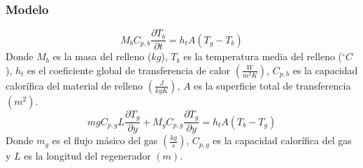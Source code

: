 \documentclass[12pt,letterpaper,final]{article}%
\begin{document}
\subsubsection*{Modelo}
\begin{equation}
	M_b C_{p,b}\frac{\partial T_b}{\partial t} = h_t A (T_g - T_b) 
\end{equation}
Donde $M_b$ es la masa del relleno ($kg$), $T_b$ es la temperatura media del relleno ($^\circ C$), $h_t$ es el coeficiente global de transferencia de calor $(\frac{W}{m^2 K})$, $C_{p,b}$ es la capacidad calorífica del material de relleno $(\frac{J}{kg K})$, $A$ es la superficie total de transferencia$(m^2)$.
\begin{equation}
	mg C_{p,g} L \frac{\partial T_g}{\partial y} + M_g C_{p,g} \frac{\partial T_g}{\partial y} = h_t A (T_b - T_g) 
\end{equation} 
Donde $m_g$ es el flujo másico del gas $(\frac{kg}{s})$, $C_{p,g}$ es la capacidad calorífica del gas y $L$ es la longitud del regenerador $(m)$. 
\end{document}
